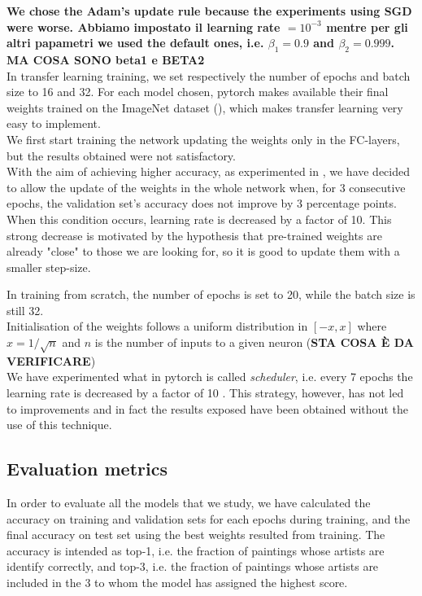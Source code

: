 \documentclass{article}
\begin{document}
\textbf{We chose the Adam's update rule because the experiments using SGD were worse. \textbf{Abbiamo impostato il }learning rate $= 10^{-3}$ mentre per gli altri papametri we used the default ones, i.e. $\beta_{1}  = 0.9$ and $\beta_{2} = 0.999$.  \textbf{MA COSA SONO beta1 e BETA2}}\\

In transfer learning training, we set respectively the number of epochs and batch size to 16 and 32.  For each model chosen, pytorch makes available their final weights  trained on the ImageNet dataset (\cite{imagenet}), which makes transfer learning very easy to implement.\\
We first start training the network updating the weights only in the FC-layers, but the results obtained were not satisfactory.\\
With the aim of achieving higher accuracy, as experimented in \cite{ArtistIdCNN406}, we have decided to allow the update of the weights in the whole network when, for 3 consecutive epochs, the validation set's accuracy does not improve by 3 percentage points. When this condition occurs, learning rate is decreased by a factor of 10. This strong decrease is motivated by the hypothesis  that pre-trained weights are already "close" to those we are looking for, so it is good to update them with a smaller step-size.

In training from scratch, the number of epochs is set to 20, while the batch size is still 32.\\ 
Initialisation of the weights follows a uniform distribution in $[-x, x]$ where $x=1/\sqrt n$ and $n$ is the number of inputs to a given neuron (\textbf{STA COSA È DA VERIFICARE})\\
We have experimented what in pytorch is called \textit{scheduler}, i.e. every 7 epochs the learning rate is decreased by a factor of 10 . This strategy, however, has not led to improvements and in fact the results exposed have been obtained without the use of this technique.

\subsection{Evaluation metrics}
In order to evaluate all the models that we study, we have calculated the accuracy on training and validation sets for each epochs during training, and the final accuracy on test set using the best weights resulted from training. The accuracy is intended as top-1, i.e.  the fraction of paintings whose artists are identify correctly, and top-3, i.e. the fraction of paintings whose artists are included in the 3 to whom the model has assigned the highest score.
\end{document}
